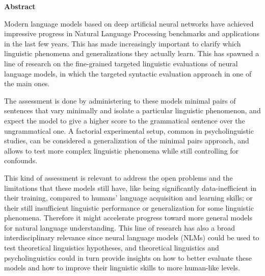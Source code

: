 \thispagestyle{plain}
\begin{center}
	\Large
	\vspace{1.8cm}
    \textbf{Abstract}
    	\vspace{0.9cm}
\end{center}

\normalsize
Modern language models based on deep artificial neural networks have achieved impressive progress in Natural Language Processing benchmarks and applications in the last few years. This has made increasingly important to clarify which linguistic phenomena and generalizations they actually learn. This has spawned a line of research on the fine-grained targeted linguistic evaluations of neural language models, in which the targeted syntactic evaluation approach in one of the main ones.

The assessment is done by administering to these models minimal pairs of sentences that vary minimally and isolate a particular linguistic phenomenon, and expect the model to give a higher score to the grammatical sentence over the ungrammatical one. A factorial experimental setup, common in psycholinguistic studies, can be considered a generalization of the minimal pairs approach, and allows to test more complex linguistic phenomena while still controlling for confounds.


% 


This kind of assessment is 
relevant to address the open problems and the limitations that these models still have, like being significantly data-inefficient in their training, compared to humans’ language acquisition and learning skills; or their still insufficient linguistic performance or generalization for some linguistic phenomena. Therefore it might accelerate progress toward more general models for natural language understanding. This line of research has also a broad interdisciplinary relevance since neural language models (NLMs) could be used to test theoretical linguistics hypotheses, and theoretical linguistics and psycholinguistics could in turn provide insights on how to better evaluate these models and how to improve their linguistic skills to more human-like levels.\\ 

